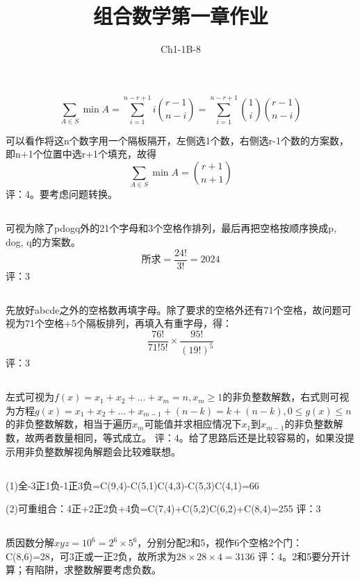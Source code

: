 \documentclass[fontset=windows]{article}
\title{\heiti\zihao{2} 组合数学第一章作业}
\author{\songti Ch1-1B-8}
\begin{document}
\begin{sloppypar}
\maketitle
\thispagestyle{empty}

\subsection{}
$$\sum_{A \in S}\min A=\sum_{i=1}^{n-r+1}{i\binom{r-1}{n-i}}=\sum_{i=1}^{n-r+1}{\binom{1}{i}\binom{r-1}{n-i}}$$\par
可以看作将这n个数字用一个隔板隔开，左侧选1个数，右侧选r-1个数的方案数，即n+1个位置中选r+1个填充，故得
$$\sum_{A \in S}\min A=\binom{r+1}{n+1}$$
评：4。要考虑问题转换。

\subsection{}
可视为除了pdogq外的21个字母和3个空格作排列，最后再把空格按顺序换成p, dog, q的方案数。
$$\mbox{所求}=\frac{24!}{3!}=2024$$
评：3

\subsection{}
先放好abcde之外的空格数再填字母。除了要求的空格外还有71个空格，故问题可视为71个空格+5个隔板排列，再填入有重字母，得：
$$\frac{76!}{71!5!} \times \frac{95!}{(19!)^5}$$
评：3

\subsection{}
左式可视为$f(x)=x_1+x_2+...+x_m=n, x_m\geq1$的非负整数解数，右式则可视为方程$g(x)=x_1+x_2+...+x_{m-1}+(n-k)=k+(n-k), 0 \leq g(x) \leq n$的非负整数解数，相当于遍历$x_m$可能值并求相应情况下$x_1$到$x_{m-1}$的非负整数解数，故两者数量相同，等式成立。
评：4。给了思路后还是比较容易的，如果没提示用非负整数解视角解题会比较难联想。

\subsection{}
(1)全-3正1负-1正3负=C(9,4)-C(5,1)C(4,3)-C(5,3)C(4,1)=66 \par
(2)可重组合：4正+2正2负+4负=C(7,4)+C(5,2)C(6,2)+C(8,4)=255
评：3

\subsection{}
质因数分解$xyz=10^6=2^6 \times 5^6$，分别分配2和5，视作6个空格2个门：C(8,6)=28，可3正或一正2负，故所求为$28\times28\times4=3136$
评：4。2和5要分开计算；有陷阱，求整数解要考虑负数。


\end{sloppypar}
\end{document}
